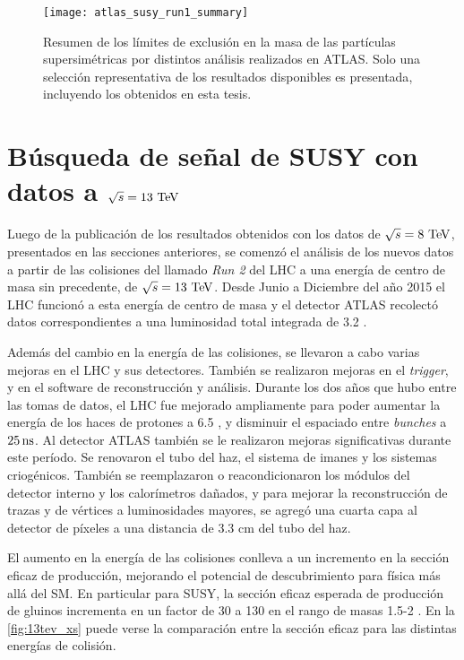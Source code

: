 \begin{figure}[!htb]
  \centering

  \texttt{[image: atlas\_susy\_run1\_summary]}

  \caption{Resumen de los límites de exclusión en la masa de las partículas
    supersimétricas por distintos análisis realizados en ATLAS. Solo una
    selección representativa de los resultados disponibles es
    presentada\cite{susy_summary}, incluyendo los obtenidos en esta tesis.}
  \label{fig:susy_summary}

\end{figure}



\section{Búsqueda de señal de SUSY con datos a $\sqrt{s} = 13 \tev$}
\label{sec:results13tev}

Luego de la publicación de los resultados obtenidos con los datos de
$\sqrt{s}=8\tev$, presentados en las secciones anteriores, se comenzó el
análisis de los nuevos datos a partir de las colisiones del llamado \emph{Run
  2} del LHC a una energía de centro de masa sin
precedente, de $\sqrt{s} = 13 \tev$. Desde Junio a Diciembre del a\~no 2015 el LHC funcionó a
esta energía de centro de masa y el detector ATLAS recolectó datos
correspondientes a una luminosidad total integrada de 3.2 \ifb.

Además del cambio en la energía de las colisiones, se llevaron a cabo varias
mejoras en el LHC y sus detectores. También se realizaron mejoras en el \emph{trigger}, y en el
software de reconstrucción y análisis.
Durante los dos a\~nos que hubo entre las tomas de datos, el LHC fue mejorado
ampliamente para poder aumentar la energía de los haces de protones a 6.5
\tev, y disminuir el espaciado entre \emph{bunches} a $\unit[25]{ns}$.
Al detector ATLAS también se le realizaron mejoras significativas durante este período.
Se renovaron el tubo del haz, el sistema de imanes y los sistemas criogénicos. También se
reemplazaron o reacondicionaron los módulos del detector interno y los
calorímetros dañados, y para mejorar la reconstrucción de trazas y de vértices a
luminosidades mayores, se agregó una cuarta capa al detector de píxeles a una
distancia de 3.3 cm del tubo del haz.

El aumento en la energía de las colisiones conlleva a un incremento en la
sección eficaz de producción, mejorando el potencial de descubrimiento para
física más allá del SM. En particular para SUSY, la sección eficaz esperada de
producción de gluinos incrementa en un factor de 30 a 130 en el rango de masas
1.5-2 {\tev}. En la \cref{fig:13tev_xs} puede verse la comparación entre la
sección eficaz para las distintas energías de colisión.

